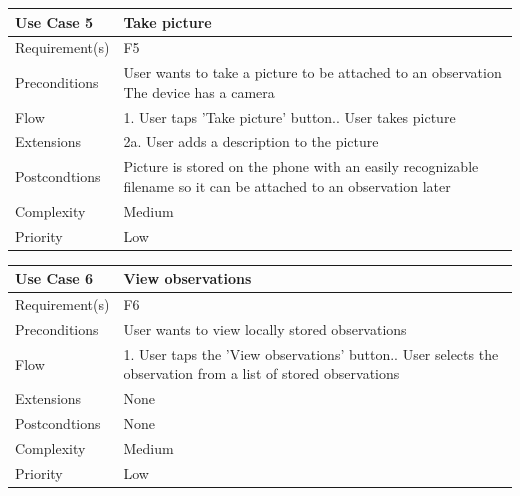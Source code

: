 \begin{tabular}[t]{|l|p{}|}\hline
	Use Case 5&Take picture\\\hline
	Requirement(s)&F5\\\hline
	Preconditions&User wants to take a picture to be attached to an observation\newline
	The device has a camera\\\hline
	Flow&1. User taps 'Take picture' button.\newline
	2. User takes picture \\\hline
	Extensions& 2a. User adds a description to the picture\\\hline
	Postcondtions&Picture is stored on the phone with an easily recognizable filename so it can be attached to an observation 	later\\\hline
	Complexity&Medium\\\hline
	Priority&Low\\\hline
\end{tabular}
	
\hspace{2em}

\begin{tabular}[t]{|l|p{}|}\hline
	Use Case 6&View observations\\\hline
	Requirement(s)&F6\\\hline
	Preconditions&User wants to view locally stored observations\\\hline
	Flow&1. User taps the 'View observations' button.\newline
	2. User selects the observation from a list of stored observations \\\hline
	Extensions&None \\\hline
	Postcondtions&None\\\hline
	Complexity&Medium\\\hline
	Priority&Low\\\hline
\end{tabular}

\hspace{2em}

